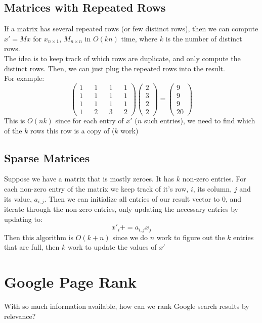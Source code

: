 \documentclass[12pt]{article}
\theoremstyle{definition}
\begin{document}
\subsection{Matrices with Repeated Rows}
If a matrix has several repeated rows (or few distinct rows), then we can compute $x' = Mx$ for $x_{n \times 1}$, $M_{n\times n}$ in $O(kn)$ time, where $k$ is the number of distinct rows. 
\\ \linebreak
The idea is to keep track of which rows are duplicate, and only compute the distinct rows. Then, we can just plug the repeated rows into the result.
\\ 
For example:
$$\begin{pmatrix}
1 && 1 && 1 && 1\\
1 && 1 && 1 && 1\\
1 && 1 && 1 && 1\\
1 && 2 && 3 && 2
\end{pmatrix}
\begin{pmatrix}
2 \\ 3 \\ 2 \\ 2
\end{pmatrix}
=
\begin{pmatrix}
9 \\
9\\
9\\
20
\end{pmatrix}
$$
This is $O(nk)$ since for each entry of $x'$ ($n$ such entries), we need to find which of the $k$ rows this row is a copy of ($k$ work)
\subsection{Sparse Matrices}
Suppose we have a matrix that is mostly zeroes. It has $k$ non-zero entries. For each non-zero entry of the matrix we keep track of it's row, $i$, its column, $j$ and its value, $a_{i,j}$. Then we can initialize all entries of our result vector to 0, and iterate through the non-zero entries, only updating the necessary entries by updating to:
$$x'_{i} += a_{i,j}x_{j}$$
Then this algorithm is $O(k+n)$ since we do $n$ work to figure out the $k$ entries that are full, then $k$ work to update the values of $x'$ 


\section{Google Page Rank}
With so much information available, how can we rank Google search results by relevance? 
\\ \linebreak
\end{document}
